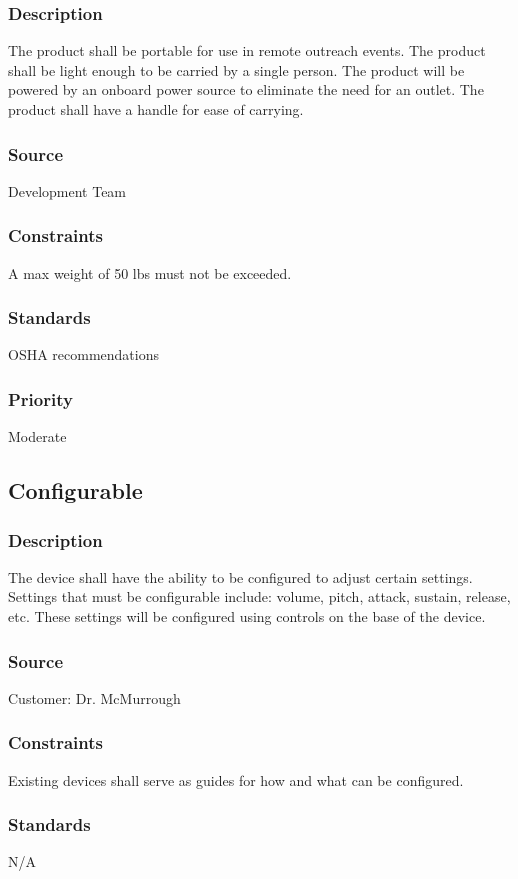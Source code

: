 \subsubsection{Description}
The product shall be portable for use in remote outreach events. The product shall be light enough to be carried by a single person. The product will be powered by an onboard power source to eliminate the need for an outlet. The product shall have a handle for ease of carrying.
\subsubsection{Source}
Development Team
\subsubsection{Constraints}
A max weight of 50 lbs must not be exceeded.
\subsubsection{Standards}
OSHA recommendations
\subsubsection{Priority}
Moderate

\subsection{Configurable}
\subsubsection{Description}
The device shall have the ability to be configured to adjust certain settings. Settings that must be configurable include: volume, pitch, attack, sustain, release, etc. These settings will be configured using controls on the base of the device.
\subsubsection{Source}
Customer: Dr. McMurrough
\subsubsection{Constraints}
Existing devices shall serve as guides for how and what can be configured.
\subsubsection{Standards}
N/A
